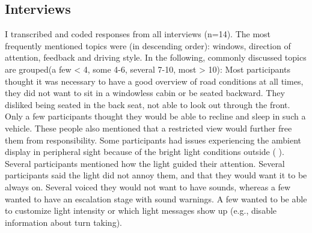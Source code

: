 \subsection{Interviews}
\label{ssec:interviews}

I transcribed and coded responses from all interviews (n=14). The most frequently mentioned topics were (in descending order): windows, direction of attention, feedback and driving style. In the following, commonly discussed topics are grouped(a few < 4, some 4-6, several 7-10, most > 10): Most participants thought it was necessary to have a good overview of road conditions at all times, they did not want to sit in a windowless cabin or be seated backward. They disliked being seated in the back seat, not able to look out through the front. Only a few participants thought they would be able to recline and sleep in such a vehicle. These people also mentioned that a restricted view would further free them from responsibility. Some participants had issues experiencing the ambient display in peripheral sight because of the bright light conditions outside ( \emph{}). Several participants mentioned how the light guided their attention. Several participants said the light did not annoy them, and that they would want it to be always on. Several voiced they would not want to have sounds, whereas a few wanted to have an escalation stage with sound warnings. A few wanted to be able to customize light intensity or which light messages show up (e.g., disable information about turn taking).

